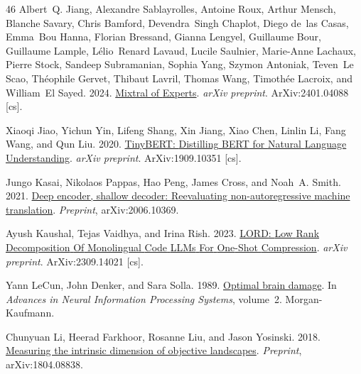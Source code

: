 \documentclass[11pt]{article}
\begin{document}
\begin{thebibliography}{46}
Albert~Q. Jiang, Alexandre Sablayrolles, Antoine Roux, Arthur Mensch, Blanche Savary, Chris Bamford, Devendra~Singh Chaplot, Diego de~las Casas, Emma~Bou Hanna, Florian Bressand, Gianna Lengyel, Guillaume Bour, Guillaume Lample, Lélio~Renard Lavaud, Lucile Saulnier, Marie-Anne Lachaux, Pierre Stock, Sandeep Subramanian, Sophia Yang, Szymon Antoniak, Teven~Le Scao, Théophile Gervet, Thibaut Lavril, Thomas Wang, Timothée Lacroix, and William~El Sayed. 2024.
\newblock \href {http://arxiv.org/abs/2401.04088} {Mixtral of {Experts}}.
\newblock \emph{arXiv preprint}.
\newblock ArXiv:2401.04088 [cs].

Xiaoqi Jiao, Yichun Yin, Lifeng Shang, Xin Jiang, Xiao Chen, Linlin Li, Fang Wang, and Qun Liu. 2020.
\newblock \href {http://arxiv.org/abs/1909.10351} {{TinyBERT}: {Distilling} {BERT} for {Natural} {Language} {Understanding}}.
\newblock \emph{arXiv preprint}.
\newblock ArXiv:1909.10351 [cs].

Jungo Kasai, Nikolaos Pappas, Hao Peng, James Cross, and Noah~A. Smith. 2021.
\newblock \href {https://arxiv.org/abs/2006.10369} {Deep encoder, shallow decoder: Reevaluating non-autoregressive machine translation}.
\newblock \emph{Preprint}, arXiv:2006.10369.

Ayush Kaushal, Tejas Vaidhya, and Irina Rish. 2023.
\newblock \href {http://arxiv.org/abs/2309.14021} {{LORD}: {Low} {Rank} {Decomposition} {Of} {Monolingual} {Code} {LLMs} {For} {One}-{Shot} {Compression}}.
\newblock \emph{arXiv preprint}.
\newblock ArXiv:2309.14021 [cs].

Yann LeCun, John Denker, and Sara Solla. 1989.
\newblock \href {https://proceedings.neurips.cc/paper_files/paper/1989/file/6c9882bbac1c7093bd25041881277658-Paper.pdf} {Optimal brain damage}.
\newblock In \emph{Advances in Neural Information Processing Systems}, volume~2. Morgan-Kaufmann.

Chunyuan Li, Heerad Farkhoor, Rosanne Liu, and Jason Yosinski. 2018.
\newblock \href {https://arxiv.org/abs/1804.08838} {Measuring the intrinsic dimension of objective landscapes}.
\newblock \emph{Preprint}, arXiv:1804.08838.


\end{thebibliography}
\end{document}
